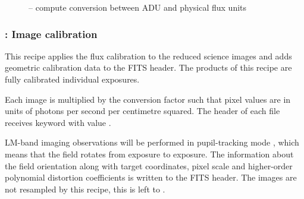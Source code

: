 

\begin{figure}[hb]
    \centering
    \def \globalscale {0.700000}
    \fontsize{10}{12}\selectfont
    
  \caption[Recipe: ]{ --
    compute conversion between ADU and physical flux units}
  \label{fig:metis_lm_img_std_process}
\end{figure}

\clearpage
\subsubsection{:  Image calibration}
\label{lm_img_calibrate}
\label{rec:metis_lm_img_calibrate}
\label{rec:lm_img_calibrate}
\label{sssec:lm_img_calibrate}

This recipe applies the flux calibration to the reduced science
images and adds geometric calibration data to the FITS header. The
products of this recipe are fully calibrated individual exposures.

Each image is multiplied by the conversion factor such that pixel
values are in units of photons per second per centimetre squared. The
header of each file receives keyword  with value %
.


LM-band imaging observations will be performed in pupil-tracking mode
\cite{METIS-operational_concept}, which means that the field rotates
from exposure to exposure.  The information about the field
orientation along with target coordinates, pixel scale and
higher-order polynomial distortion coefficients is written to the FITS
header. The images are not resampled by this recipe, this is left to
 .



